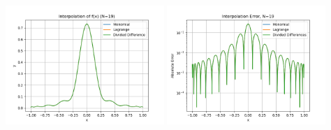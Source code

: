 \documentclass[10pt]{article}
\begin{document}
\begin{center}
  \includegraphics[width=0.45\textwidth]{lab7_uneven_interp_N19.png}
  \includegraphics[width=0.45\textwidth]{lab7_uneven_interp_error_N19.png}
\end{center}

{\small }   
\end{document}
